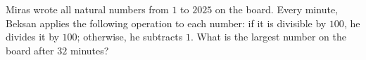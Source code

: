 Miras wrote all natural numbers from $1$ to $2025$ on the board. Every minute, Beksan applies the following operation to each number: if it is divisible by $100$, he divides it by $100$; otherwise, he subtracts $1$. What is the largest number on the board after $32$ minutes?
